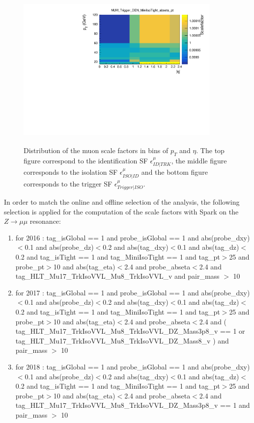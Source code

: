 \documentclass{cernatlasnote}
\begin{document}
\begin{figure}
    \includegraphics[height=8cm, width=10cm, trim= 0cm 0cm 0cm 0.cm,clip]{images/Muon/NUM_Trigger_DEN_MiniIsoTight.pdf}
    \caption{ Distribution of the muon scale factors in bins of $p_T$ and $\eta$. The top figure correspond to the identification SF $\epsilon^{\mu}_{ID|TRK}$, the middle figure corresponds to the isolation SF $\epsilon^{\mu}_{ISO|ID}$ and the bottom figure corresponds to the trigger SF $\epsilon^{\mu}_{Trigger|ISO}$.}
    \label{fig:SP1}
\end{figure}

    In order to match the online and offline selection of the analysis, the following selection is applied for the computation of the scale factors with Spark on the $Z\rightarrow\mu\mu$ resonance:\\
    \begin{enumerate}
        \item for 2016 : tag\_isGlobal == 1 and probe\_isGlobal == 1 and abs(probe\_dxy)$<$0.1 and abs(probe\_dz)$<$0.2 and abs(tag\_dxy)$<$0.1 and abs(tag\_dz)$<$0.2 and tag\_isTight == 1 and tag\_MiniIsoTight == 1 and tag\_pt$>$25 and probe\_pt$>$10  and abs(tag\_eta)$<$2.4 and probe\_abseta$<$2.4 and tag\_HLT\_Mu17\_TrkIsoVVL\_Mu8\_TrkIsoVVL\_v and pair\_mass $>$ 10
        
        \item for 2017 : tag\_isGlobal == 1 and probe\_isGlobal == 1 and abs(probe\_dxy)$<$0.1 and abs(probe\_dz)$<$0.2 and abs(tag\_dxy)$<$0.1 and abs(tag\_dz)$<$0.2 and tag\_isTight == 1 and tag\_MiniIsoTight == 1 and tag\_pt$>$25 and probe\_pt$>$10  and abs(tag\_eta)$<$2.4 and probe\_abseta$<$2.4 and ( tag\_HLT\_Mu17\_TrkIsoVVL\_Mu8\_TrkIsoVVL\_DZ\_Mass3p8\_v == 1 or \\ tag\_HLT\_Mu17\_TrkIsoVVL\_Mu8\_TrkIsoVVL\_DZ\_Mass8\_v ) and pair\_mass $>$ 10
        
        \item for 2018 :  tag\_isGlobal == 1 and probe\_isGlobal == 1 and abs(probe\_dxy)$<$0.1 and abs(probe\_dz)$<$0.2 and abs(tag\_dxy)$<$0.1 and abs(tag\_dz)$<$0.2 and tag\_isTight == 1 and tag\_MiniIsoTight == 1 and tag\_pt$>$25 and probe\_pt$>$10  and abs(tag\_eta)$<$2.4 and probe\_abseta$<$2.4 and tag\_HLT\_Mu17\_TrkIsoVVL\_Mu8\_TrkIsoVVL\_DZ\_Mass3p8\_v == 1  and pair\_mass $>$ 10
    \end{enumerate}
\end{document}
